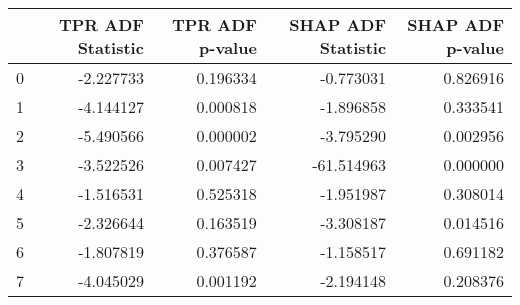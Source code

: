 \begin{tabular}{lrrrr}
\toprule
 & TPR ADF Statistic & TPR ADF p-value & SHAP ADF Statistic & SHAP ADF p-value \\
\midrule
0 & -2.227733 & 0.196334 & -0.773031 & 0.826916 \\
1 & -4.144127 & 0.000818 & -1.896858 & 0.333541 \\
2 & -5.490566 & 0.000002 & -3.795290 & 0.002956 \\
3 & -3.522526 & 0.007427 & -61.514963 & 0.000000 \\
4 & -1.516531 & 0.525318 & -1.951987 & 0.308014 \\
5 & -2.326644 & 0.163519 & -3.308187 & 0.014516 \\
6 & -1.807819 & 0.376587 & -1.158517 & 0.691182 \\
7 & -4.045029 & 0.001192 & -2.194148 & 0.208376 \\
\bottomrule
\end{tabular}
